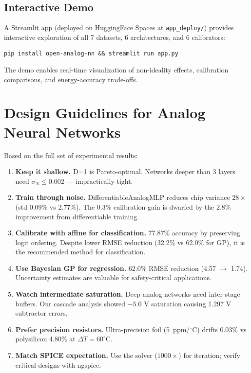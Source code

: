 \documentclass[10pt,twocolumn]{article}
\begin{document}
\subsection{Interactive Demo}

A Streamlit app (deployed on HuggingFace Spaces at \texttt{app\_deploy/}) provides interactive exploration of all 7 datasets, 6 architectures, and 6 calibrators:

\begin{verbatim}
pip install open-analog-nn && streamlit run app.py
\end{verbatim}

The demo enables real-time visualization of non-ideality effects, calibration comparisons, and energy-accuracy trade-offs.

\section{Design Guidelines for Analog Neural Networks}

Based on the full set of experimental results:
\begin{enumerate}
  \item \textbf{Keep it shallow.} D=1 is Pareto-optimal. Networks deeper than 3 layers need $\sigma_N \leq 0.002$ --- impractically tight.
  \item \textbf{Train through noise.} DifferentiableAnalogMLP reduces chip variance $28\times$ (std 0.09\% vs 2.77\%). The $0.3$\% calibration gain is dwarfed by the $2.8$\% improvement from differentiable training.
  \item \textbf{Calibrate with affine for classification.} 77.87\% accuracy by preserving logit ordering. Despite lower RMSE reduction (32.2\% vs 62.0\% for GP), it is the recommended method for classification.
  \item \textbf{Use Bayesian GP for regression.} 62.0\% RMSE reduction (4.57 $\to$ 1.74). Uncertainty estimates are valuable for safety-critical applications.
  \item \textbf{Watch intermediate saturation.} Deep analog networks need inter-stage buffers. Our cascade analysis showed $-5.0$ V saturation causing 1.297 V subtractor errors.
  \item \textbf{Prefer precision resistors.} Ultra-precision foil (5~ppm/$^\circ$C) drifts 0.03\% vs polysilicon 4.80\% at $\Delta T = 60^\circ$C.
  \item \textbf{Match SPICE expectation.} Use the solver ($1000\times$) for iteration; verify critical designs with ngspice.
\end{enumerate}
\end{document}
